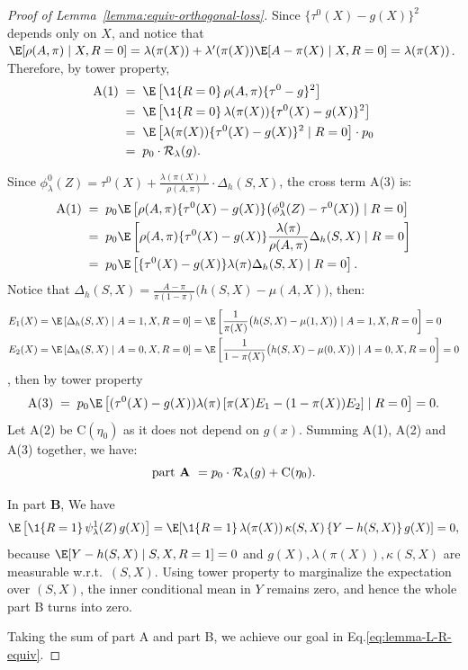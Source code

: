 \documentclass{article} %
\theoremstyle{plain} %
\theoremstyle{definition} %
\theoremstyle{remark} %
\begin{document}
\begin{proof}[Proof of Lemma~\ref{lemma:equiv-orthogonal-loss}]
Since $\{\tau^0(X)-g(X)\}^2$ depends only on $X$, and notice that $\E[\rho(A,\pi)\mid X,R=0]=\lambda(\pi(X))+\lambda'(\pi(X))\E[A-\pi(X)\mid X,R=0]
=\lambda(\pi(X))$. Therefore, by tower property,
\begin{align}
\text{A(1)}
& \;=\;
\E\left[\1\{R=0\}\,\rho(A,\pi)\{\tau^0-g\}^2\right] \\
& \;=\; \E\left[\1\{R=0\}\,\lambda(\pi(X))\{\tau^0(X)-g(X)\}^2\right] \\
& \;=\; \E\left[\lambda(\pi(X))\{\tau^0(X)-g(X)\}^2 \mid R = 0\right] \cdot p_0 \\
& \;=\; p_0\cdot \mathcal{R}_\lambda(g).
\end{align}

Since $\phi^0_\lambda(Z)=\tau^0(X)+\frac{\lambda(\pi(X))}{\rho(A,\pi)}\cdot \Delta_h(S,X)$, the cross term A(3) is:
\begin{align}
    \text{A(1)}
& \;=\; p_0\E\left[\rho(A,\pi)\{\tau^0(X)-g(X)\}\big(\phi^0_\lambda(Z)-\tau^0(X)\big) \mid R=0\right] \\
& \;=\; p_0\E\left[\rho(A,\pi)\{\tau^0(X)-g(X)\}\frac{\lambda(\pi)}{\rho(A,\pi)} \Delta_h(S,X) \mid R=0\right] \\
& \;=\; p_0\E\left[\{\tau^0(X)-g(X)\}\lambda(\pi)\Delta_h(S,X) \mid R=0\right].
\end{align}
Notice that $\Delta_h(S,X)=\frac{A-\pi}{\pi(1-\pi)}\bigl(h(S,X)-\mu(A,X)\bigr)$, then:
\begin{align}
    E_1(X) &= \E\left[\Delta_h(S,X)\mid A=1,X,R=0\right]=\E\left[\frac{1}{\pi(X)}\bigl(h(S,X)-\mu(1,X)\bigr) \mid A=1,X,R=0\right] = 0 \\
    E_2(X) &=\E\left[\Delta_h(S,X)\mid A=0,X,R=0\right] = \E\left[\frac{1}{1-\pi(X)}\bigl(h(S,X)-\mu(0,X)\bigr) \mid A=0,X,R=0\right] = 0
\end{align}
, then by tower property
\begin{equation}
    \text{A(3)}\;=\; p_0\E\left[(\tau^0(X)-g(X))\lambda(\pi) \left[\pi(X)E_1-(1-\pi(X))E_2\right] \mid R=0\right] = 0.
\end{equation}
Let A(2) be $\text{C}(\eta_0)$ as it does not depend on $g(x)$. Summing A(1), A(2) and A(3) together, we have:
\begin{equation}
\label{eq:part-A}
    \text{part \textbf{A} } = p_0\cdot \mathcal{R}_\lambda(g) + \text{C}(\eta_0).
\end{equation}

In part \textbf{B}, We have
\begin{equation}
\label{eq:part-B}
\E\left[\1\{R=1\}\,\psi_\lambda^1(Z)\,g(X)\right]
=\E\!\left[\1\{R=1\}\,\lambda(\pi(X))\,\kappa(S,X)\,\{Y-h(S,X)\}\,g(X)\right]=0,
\end{equation}
because $\E[Y-h(S,X)\mid S,X,R=1]=0$ and $g(X),\lambda(\pi(X)),\kappa(S,X)$ are measurable w.r.t.\ $(S,X)$. Using tower property to marginalize the expectation over $(S,X)$, the inner conditional mean in $Y$ remains
zero, and hence the whole part B turns into zero.

Taking the sum of part A and part B, we achieve our goal in Eq.\ref{eq:lemma-L-R-equiv}. 
\end{proof}
\end{document}
